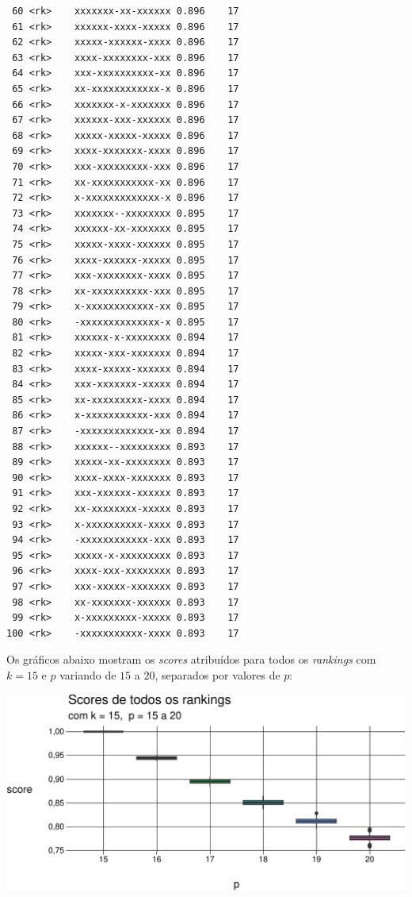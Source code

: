\documentclass[
  letterpaper,
  DIV=11,
  numbers=noendperiod]{scrreprt}
\begin{document}
\begin{verbatim}
 60 <rk>    xxxxxxx-xx-xxxxxx 0.896    17
 61 <rk>    xxxxxx-xxxx-xxxxx 0.896    17
 62 <rk>    xxxxx-xxxxxx-xxxx 0.896    17
 63 <rk>    xxxx-xxxxxxxx-xxx 0.896    17
 64 <rk>    xxx-xxxxxxxxxx-xx 0.896    17
 65 <rk>    xx-xxxxxxxxxxxx-x 0.896    17
 66 <rk>    xxxxxxx-x-xxxxxxx 0.896    17
 67 <rk>    xxxxxx-xxx-xxxxxx 0.896    17
 68 <rk>    xxxxx-xxxxx-xxxxx 0.896    17
 69 <rk>    xxxx-xxxxxxx-xxxx 0.896    17
 70 <rk>    xxx-xxxxxxxxx-xxx 0.896    17
 71 <rk>    xx-xxxxxxxxxxx-xx 0.896    17
 72 <rk>    x-xxxxxxxxxxxxx-x 0.896    17
 73 <rk>    xxxxxxx--xxxxxxxx 0.895    17
 74 <rk>    xxxxxx-xx-xxxxxxx 0.895    17
 75 <rk>    xxxxx-xxxx-xxxxxx 0.895    17
 76 <rk>    xxxx-xxxxxx-xxxxx 0.895    17
 77 <rk>    xxx-xxxxxxxx-xxxx 0.895    17
 78 <rk>    xx-xxxxxxxxxx-xxx 0.895    17
 79 <rk>    x-xxxxxxxxxxxx-xx 0.895    17
 80 <rk>    -xxxxxxxxxxxxxx-x 0.895    17
 81 <rk>    xxxxxx-x-xxxxxxxx 0.894    17
 82 <rk>    xxxxx-xxx-xxxxxxx 0.894    17
 83 <rk>    xxxx-xxxxx-xxxxxx 0.894    17
 84 <rk>    xxx-xxxxxxx-xxxxx 0.894    17
 85 <rk>    xx-xxxxxxxxx-xxxx 0.894    17
 86 <rk>    x-xxxxxxxxxxx-xxx 0.894    17
 87 <rk>    -xxxxxxxxxxxxx-xx 0.894    17
 88 <rk>    xxxxxx--xxxxxxxxx 0.893    17
 89 <rk>    xxxxx-xx-xxxxxxxx 0.893    17
 90 <rk>    xxxx-xxxx-xxxxxxx 0.893    17
 91 <rk>    xxx-xxxxxx-xxxxxx 0.893    17
 92 <rk>    xx-xxxxxxxx-xxxxx 0.893    17
 93 <rk>    x-xxxxxxxxxx-xxxx 0.893    17
 94 <rk>    -xxxxxxxxxxxx-xxx 0.893    17
 95 <rk>    xxxxx-x-xxxxxxxxx 0.893    17
 96 <rk>    xxxx-xxx-xxxxxxxx 0.893    17
 97 <rk>    xxx-xxxxx-xxxxxxx 0.893    17
 98 <rk>    xx-xxxxxxx-xxxxxx 0.893    17
 99 <rk>    x-xxxxxxxxx-xxxxx 0.893    17
100 <rk>    -xxxxxxxxxxx-xxxx 0.893    17
\end{verbatim}

Os gráficos abaixo mostram os \emph{scores} atribuídos para todos os
\emph{rankings} com $k = 15$ e $p$ variando de $15$ a $20$, separados
por valores de $p$:

\begin{center}
\includegraphics[width=1\textwidth,height=\textheight]{usando-posicoes_files/figure-pdf/unnamed-chunk-7-1.pdf}
\end{center}
\end{document}

